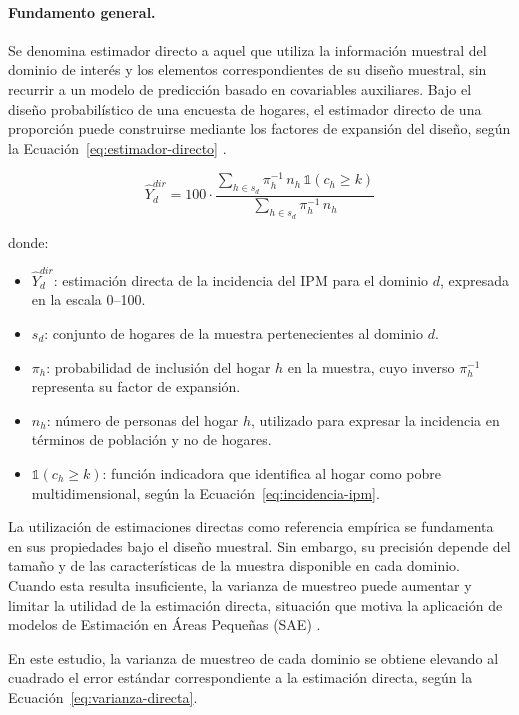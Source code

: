 \paragraph{Fundamento general.}
Se denomina estimador directo a aquel que utiliza la información muestral del dominio de interés y los elementos correspondientes de su diseño muestral, sin recurrir a un modelo de predicción basado en covariables auxiliares. Bajo el diseño probabilístico de una encuesta de hogares, el estimador directo de una proporción puede construirse mediante los factores de expansión del diseño, según la Ecuación~\ref{eq:estimador-directo} \cite{SarndalSwenssonWretman_1992}.

\begin{equation}
    \hat{Y}_d^{dir} = 100 \cdot \frac{\sum_{h \in s_d} \pi_h^{-1}\, n_h\, \mathbb{1}(c_h \geq k)}{\sum_{h \in s_d} \pi_h^{-1}\, n_h}
    \label{eq:estimador-directo}
\end{equation}

\noindent donde:

\begin{itemize}
    \item $\hat{Y}_d^{dir}$: estimación directa de la incidencia del IPM para el dominio $d$, expresada en la escala 0--100.
    \item $s_d$: conjunto de hogares de la muestra pertenecientes al dominio $d$.
    \item $\pi_h$: probabilidad de inclusión del hogar $h$ en la muestra, cuyo inverso $\pi_h^{-1}$ representa su factor de expansión.
    \item $n_h$: número de personas del hogar $h$, utilizado para expresar la incidencia en términos de población y no de hogares.
    \item $\mathbb{1}(c_h \geq k)$: función indicadora que identifica al hogar como pobre multidimensional, según la Ecuación~\ref{eq:incidencia-ipm}.
\end{itemize}

La utilización de estimaciones directas como referencia empírica se fundamenta en sus propiedades bajo el diseño muestral. Sin embargo, su precisión depende del tamaño y de las características de la muestra disponible en cada dominio. Cuando esta resulta insuficiente, la varianza de muestreo puede aumentar y limitar la utilidad de la estimación directa, situación que motiva la aplicación de modelos de Estimación en Áreas Pequeñas (SAE) \cite{RaoMolina_2015}.

En este estudio, la varianza de muestreo de cada dominio se obtiene elevando al cuadrado el error estándar correspondiente a la estimación directa, según la Ecuación~\ref{eq:varianza-directa}.

